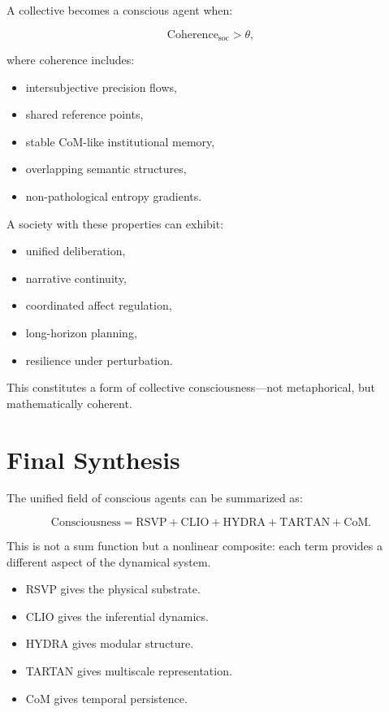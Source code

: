 \documentclass[12pt,oneside]{book}
\theoremstyle{plain}
\theoremstyle{definition}
\begin{document}
A collective becomes a conscious agent when:

\[
\mathrm{Coherence_{soc}} > \theta,
\]

where coherence includes:

\begin{itemize}
    \item intersubjective precision flows,
    \item shared reference points,
    \item stable CoM-like institutional memory,
    \item overlapping semantic structures,
    \item non-pathological entropy gradients.
\end{itemize}

A society with these properties can exhibit:

\begin{itemize}
    \item unified deliberation,
    \item narrative continuity,
    \item coordinated affect regulation,
    \item long-horizon planning,
    \item resilience under perturbation.
\end{itemize}

This constitutes a form of collective consciousness—not metaphorical, but 
mathematically coherent.

\section{Final Synthesis}

The unified field of conscious agents can be summarized as:

\[
\text{Consciousness} =
\text{RSVP} +
\text{CLIO} +
\text{HYDRA} +
\text{TARTAN} +
\text{CoM}.
\]

This is not a sum function but a nonlinear composite: each term provides a 
different aspect of the dynamical system.

\begin{itemize}
    \item RSVP gives the physical substrate.
    \item CLIO gives the inferential dynamics.
    \item HYDRA gives modular structure.
    \item TARTAN gives multiscale representation.
    \item CoM gives temporal persistence.
\end{itemize}
\end{document}
